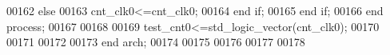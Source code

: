 \begin{DoxyCode}
00162             \textcolor{keywordflow}{else} 
00163                 \textcolor{vhdlchar}{cnt_clk0}\textcolor{vhdlchar}{<=}\textcolor{vhdlchar}{cnt_clk0};
00164             \textcolor{keywordflow}{end} \textcolor{keywordflow}{if};
00165         \textcolor{keywordflow}{end} \textcolor{keywordflow}{if};
00166     \textcolor{keywordflow}{end} \textcolor{keywordflow}{process};
00167      
00168 
00169 \textcolor{vhdlchar}{test_cnt0}\textcolor{vhdlchar}{<=}\textcolor{comment}{std\_logic\_vector}\textcolor{vhdlchar}{(}\textcolor{vhdlchar}{cnt_clk0}\textcolor{vhdlchar}{)};
00170 
00171 
00172      
00173 \textcolor{keywordflow}{end} \textcolor{vhdlchar}{arch};
00174 
00175 
00176 
00177 
00178 
\end{DoxyCode}
